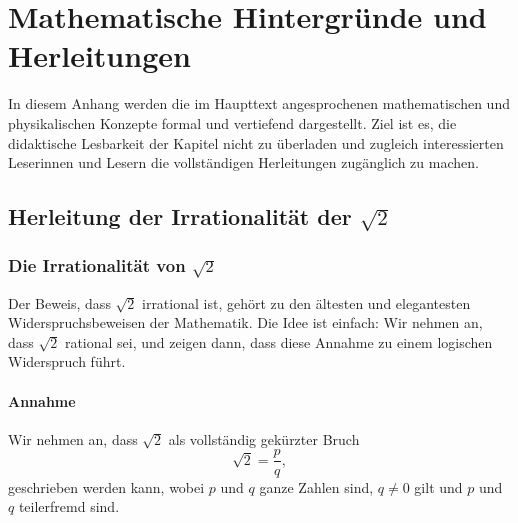 \cleardoublepage
\appendix

\setcounter{chapter}{0}
\renewcommand{\thechapter}{\Alph{chapter}}
\renewcommand{\thesection}{\thechapter.\arabic{section}}
\renewcommand{\thesubsection}{\thesection.\arabic{subsection}}
\renewcommand{\thesubsubsection}{\thesubsection.\arabic{subsubsection}}

\renewcommand{\theHchapter}{app.\Alph{chapter}}
\renewcommand{\theHsection}{\theHchapter.\arabic{section}}
\renewcommand{\theHsubsection}{\theHsection.\arabic{subsection}}
\renewcommand{\theHsubsubsection}{\theHsubsection.\arabic{subsubsection}}

\chapter{Mathematische Hintergründe und Herleitungen}
\label{anhangA}

In diesem Anhang werden die im Haupttext angesprochenen mathematischen und physikalischen Konzepte
formal und vertiefend dargestellt. Ziel ist es, die didaktische Lesbarkeit der Kapitel
nicht zu überladen und zugleich interessierten Leserinnen und Lesern
die vollständigen Herleitungen zugänglich zu machen.

\section{Herleitung der Irrationalität der $\sqrt{2}$}
\label{anhangA_wurzel2}

\subsection*{Die Irrationalität von \texorpdfstring{$\sqrt{2}$}{sqrt(2)}}

Der Beweis, dass $\sqrt{2}$ irrational ist, gehört zu den ältesten und
elegantesten Widerspruchsbeweisen der Mathematik.
Die Idee ist einfach: Wir nehmen an, dass $\sqrt{2}$ rational sei, und
zeigen dann, dass diese Annahme zu einem logischen Widerspruch führt.

\subsubsection*{Annahme}

Wir nehmen an, dass $\sqrt{2}$ als vollständig gekürzter Bruch
\[
\sqrt{2} = \frac{p}{q},
\]
geschrieben werden kann, wobei $p$ und $q$ ganze Zahlen sind,
$q \neq 0$ gilt und $p$ und $q$ teilerfremd sind.

